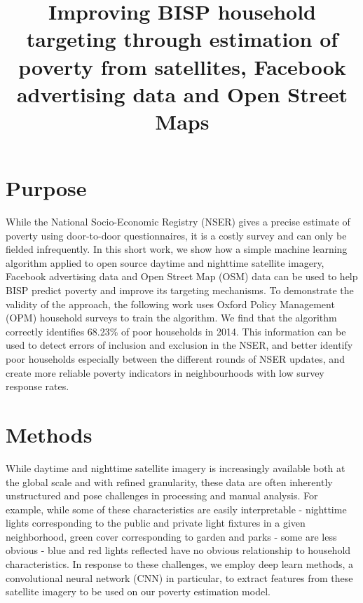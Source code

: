 \documentclass[8pt, oneside]{article}
\title{Improving BISP household targeting through estimation of poverty from satellites, Facebook advertising data and Open Street Maps}
\begin{document}
\maketitle


\section*{Purpose}

While the National Socio-Economic Registry (NSER) gives a precise estimate of poverty using door-to-door questionnaires, it is a costly survey and can only be fielded infrequently. In this short work, we show how a simple machine learning algorithm applied to open source daytime and nighttime satellite imagery, Facebook advertising data and Open Street Map (OSM) data can be used to help BISP predict poverty and improve its targeting mechanisms. To demonstrate the validity of the approach, the following work uses Oxford Policy Management (OPM) household surveys to train the algorithm. We find that the algorithm correctly identifies 68.23\% of poor households in 2014. This information can be used to detect errors of inclusion and exclusion in the NSER, and better identify poor households especially between the different rounds of NSER updates, and create more reliable poverty indicators in neighbourhoods with low survey response rates.

\section*{Methods}

While daytime and nighttime satellite imagery is increasingly available both at the global scale and with refined granularity, these data are often inherently unstructured and pose challenges in processing and manual analysis. For example, while some of these characteristics are easily interpretable - nighttime lights corresponding to the public and private light fixtures in a given neighborhood, green cover corresponding to garden and parks - some are less obvious - blue and red lights reflected have no obvious relationship to household characteristics. In response to these challenges, we employ deep learn methods, a convolutional neural network (CNN) in particular, to extract features from these satellite imagery to be used on our poverty estimation model. 
\end{document}
